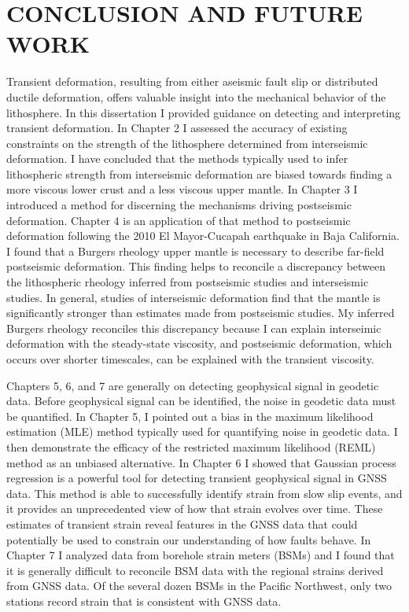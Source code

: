 \chapter{CONCLUSION AND FUTURE WORK}
Transient deformation, resulting from either aseismic fault slip or distributed ductile deformation, offers valuable insight into the mechanical behavior of the lithosphere. In this dissertation I provided guidance on detecting and interpreting transient deformation. In Chapter 2 I assessed the accuracy of existing constraints on the strength of the lithosphere determined from interseismic deformation. I have concluded that the methods typically used to infer lithospheric strength from interseismic deformation are biased towards finding a more viscous lower crust and a less viscous upper mantle. In Chapter 3 I introduced a method for discerning the mechanisms driving postseismic deformation. Chapter 4 is an application of that method to postseismic deformation following the 2010 El Mayor-Cucapah earthquake in Baja California. I found that a Burgers rheology upper mantle is necessary to describe far-field postseismic deformation. This finding helps to reconcile a discrepancy between the lithospheric rheology inferred from postseismic studies and interseismic studies. In general, studies of interseismic deformation find that the mantle is significantly stronger than estimates made from postseismic studies. My inferred Burgers rheology reconciles this discrepancy because I can explain interseimic deformation with the steady-state viscosity, and postseismic deformation, which occurs over shorter timescales, can be explained with the transient viscosity.  

Chapters 5, 6, and 7 are generally on detecting geophysical signal in geodetic data. Before geophysical signal can be identified, the noise in geodetic data must be quantified. In Chapter 5, I pointed out a bias in the maximum likelihood estimation (MLE) method typically used for quantifying noise in geodetic data. I then demonstrate the efficacy of the restricted maximum likelihood (REML) method as an unbiased alternative. In Chapter 6 I showed that Gaussian process regression is a powerful tool for detecting transient geophysical signal in GNSS data. This method is able to successfully identify strain from slow slip events, and it provides an unprecedented view of how that strain evolves over time. These estimates of transient strain reveal features in the GNSS data that could potentially be used to constrain our understanding of how faults behave. In Chapter 7 I analyzed data from borehole strain meters (BSMs) and I found that it is generally difficult to reconcile BSM data with the regional strains derived from GNSS data. Of the several dozen BSMs in the Pacific Northwest, only two stations record strain that is consistent with GNSS data.     

